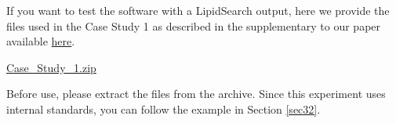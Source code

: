 \documentclass[
]{book}
\begin{document}
If you want to test the software with a LipidSearch output, here we provide the files used in the Case Study 1 as described in the supplementary to our paper available \href{https://oup.silverchair-cdn.com/oup/backfile/Content_public/Journal/bioinformatics/PAP/10.1093_bioinformatics_btac706/1/btac706_supplementary_data.docx?Expires=1670405997\&Signature=EPy4KG1w03cnGUWoa8jsEHbFRiyhKHX9Wf56yylPM2baQYjwB9oA0HoR3WUIPpWNBv2zfPRGrVm7b3Nj5aAacJ7qLmUSd9su20P4cmDuCiJbYx8ddv4P7cDzIIyeAMqmBEMscOBzWsGhB~Ql~Y8LjLXzxOlsjML8KaciMcFtZztK3Psf3wCnCxlKg9iZZ4mab0hZdA8rn048xbTk6534syqjx4KfAm2lcrDbnEC29dSmcfNyAj22CACWfOrhHHeHueNKbSu6hZeyIukQOdGKzGhTiG2D4VO4ZqH9dQ3JX-G~kAczQhQGwic-vm8hK-YcOIQrxgxnlWTaur~PV2mSww__\&Key-Pair-Id=APKAIE5G5CRDK6RD3PGA}{here}.

\href{https://github.com/ShinyFabio/ADViSELipidomics_book/raw/main/data_example/Case_Study_1.zip}{Case\_Study\_1.zip}

Before use, please extract the files from the archive. Since this experiment uses internal standards, you can follow the example in Section \ref{sec32}.

  
\end{document}
